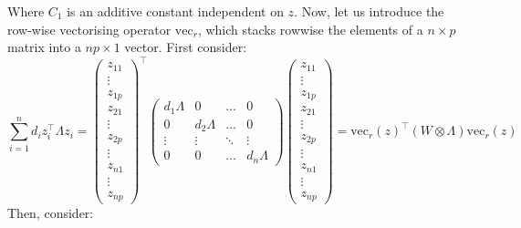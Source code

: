 \documentclass[openany]{book}
\begin{document}
Where $C_1$ is an additive constant independent on $z$. Now, let us introduce the row-wise vectorising operator $\mathrm{vec}_r$, which stacks rowwise the elements of a $n \times p$ matrix into a $np \times 1$ vector. First consider:
$$
 \sum_{i=1}^n d_i z^{\top}_i \Lambda z_i = 
\begin{pmatrix}
z_{11} \\ \vdots \\ z_{1p} \\ z_{21} \\ \vdots \\ z_{2p} \\ \vdots \\z_{n1} \\ \vdots \\ z_{np}
\end{pmatrix}^{\top}
\begin{pmatrix}
d_1 \Lambda & 0 & \ldots & 0 \\
0 & d_2 \Lambda & \ldots & 0 \\
\vdots & \vdots & \ddots & \vdots \\
0 & 0 & \ldots & d_n \Lambda
\end{pmatrix}
\begin{pmatrix}
z_{11} \\ \vdots \\ z_{1p} \\ z_{21} \\ \vdots \\ z_{2p} \\ \vdots \\z_{n1} \\ \vdots \\ z_{np}
\end{pmatrix}  = 
\mathrm{vec}_r(z) ^{\top} (W \otimes \Lambda) \mathrm{vec}_r(z)
$$
Then, consider:
\end{document}
